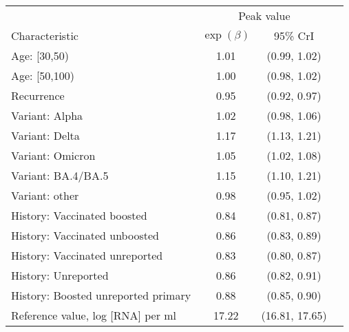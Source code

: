 \documentclass[11pt]{article}
\begin{document}
\begin{table}[p]
    \centering
    \begin{tabular}{lccc}
    \toprule
     & \multicolumn{2}{c}{Peak value} \\
    Characteristic & $\exp(\beta)$ & 95\% CrI\\
    \midrule
     Age: [30,50) & 1.01 & (0.99, 1.02)\\
     Age: [50,100) & 1.00 & (0.98, 1.02)\\
     Recurrence & 0.95 & (0.92, 0.97)\\
     Variant: Alpha & 1.02 & (0.98, 1.06)\\
     Variant: Delta & 1.17 & (1.13, 1.21)\\
     Variant: Omicron & 1.05 & (1.02, 1.08)\\
     Variant: BA.4/BA.5 & 1.15 & (1.10, 1.21)\\
     Variant: other & 0.98 & (0.95, 1.02)\\
     History: Vaccinated boosted & 0.84 & (0.81, 0.87)\\
     History: Vaccinated unboosted & 0.86 & (0.83, 0.89)\\
     History: Vaccinated unreported & 0.83 & (0.80, 0.87)\\
     History: Unreported & 0.86 & (0.82, 0.91)\\
     History: Boosted unreported primary & 0.88 & (0.85, 0.90)\\
     \midrule
     Reference value, log [RNA] per ml & 17.22 & (16.81, 17.65)\\
     \bottomrule
    \end{tabular}


\end{table}
\end{document}
